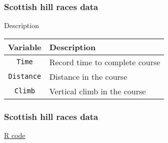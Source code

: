 \documentclass[handout]{beamer}
\begin{document}

   \begin{frame} \frametitle{Scottish hill races data}

   \begin{block}
   {Description}

   \begin{tabular}{c|l}
   Variable & Description \\ \hline
   {\tt Time} & Record time to complete course \\
   {\tt Distance} & Distance in the course \\
   {\tt Climb} & Vertical climb in the course \\
   \end{tabular}
   \end{block}
   \end{frame}



   \begin{frame}
   \frametitle{Scottish hill races data}
   \begin{center}
   \end{center}
   \href{http://stats191.stanford.edu/diagnostics.html#scottish-hill-races}{R code}
   \end{frame}

\end{document}
